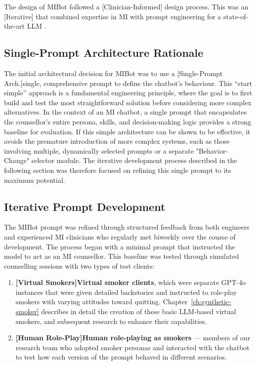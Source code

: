 The design of MIBot followed a [Clinician-Informed] design process. This was an [Iterative] that combined expertise in MI with prompt engineering for a state-of-the-art LLM \cite{openai2024gpt4ocard}.

\subsection{Single-Prompt Architecture Rationale}
\label{sec:single-prompt-rationale}

The initial architectural decision for MIBot was to use a [Single-Prompt Arch.]single, comprehensive prompt to define the chatbot's behaviour. This ``start simple'' approach is a fundamental engineering principle, where the goal is to first build and test the most straightforward solution before considering more complex alternatives. In the context of an MI chatbot, a single prompt that encapsulates the counsellor's entire persona, skills, and decision-making logic provides a strong baseline for evaluation. If this simple architecture can be shown to be effective, it avoids the premature introduction of more complex systems, such as those involving multiple, dynamically selected prompts or a separate "Behavior-Change" selector module. The iterative development process described in the following section was therefore focused on refining this single prompt to its maximum potential.

\subsection{Iterative Prompt Development}
The MIBot prompt was refined through structured feedback from both engineers and experienced MI clinicians who regularly met biweekly over the course of development. The process began with a minimal prompt that instructed the model to act as an MI counsellor. This baseline was tested through simulated counselling sessions with two types of test clients:

\begin{enumerate}
    \item \textbf{[Virtual Smokers]Virtual smoker clients}, which were separate GPT-4o instances that were given detailed backstories and instructed to role-play smokers with varying attitudes toward quitting. Chapter~\ref{ch:synthetic-smoker} describes in detail the creation of these basic LLM-based virtual smokers, and subsequent research to enhance their capabilities.
    \item \textbf{[Human Role-Play]Human role-playing as smokers} --- members of our research team who adopted smoker personas and interacted with the chatbot to test how each version of the prompt behaved in different scenarios.
\end{enumerate}

